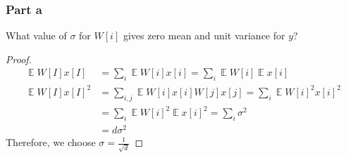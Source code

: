 \documentclass{amsart}
\DeclareMathOperator{\ee}{\mathbb{E}}
\theoremstyle{definition}
\begin{document}
\subsubsection*{Part a} What value of $\sigma$ for $W[i]$ gives zero mean and unit variance for $y$?
\begin{proof}
  \begin{align*}
    \ee{W[I]x[I]} &= \sum_{i} \ee{W[i]x[i]} = \sum_{i} \ee{W[i]}\ee{x[i]}\\
    \ee{W[I]x[I]^2} &= \sum_{i,j} \ee{W[i]x[i]W[j]x[j]} = \sum_{i} \ee{W[i]^2x[i]^2} \\
    &= \sum_{i} \ee{W[i]^2}\ee{x[i]^2} = \sum_{i} \sigma^2\\
    &= d \sigma^2
  \end{align*}
  Therefore, we choose $\sigma = \frac1{\sqrt{d}}$
\end{proof}
\end{document}

